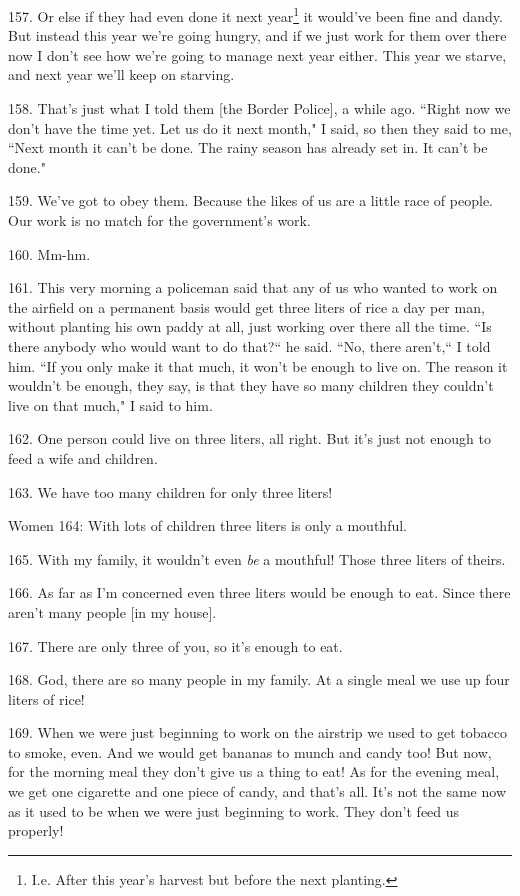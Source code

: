157. Or else if they had even done it next year\footnote{I.e. After this year's harvest but before the next planting.} it would've been fine and dandy.
But instead this year we're going hungry, and if we just work for them over there
now I don't see how we're going to manage next year either. This year we starve,
and next year we'll keep on starving.

158. That's just what I told them [the Border Police], a while ago. ``Right
now we don't have the time yet. Let us do it next month," I said, so then
they said to me, ``Next month it can't be done. The rainy season has already set
in. It can't be done."

159. We've got to obey them. Because the likes of us are a little race of people.
Our work is no match for the government's work.

160. Mm-hm.

161. This very morning a policeman said that any of us who wanted to work on the
airfield on a permanent basis would get three liters of rice a day per man, without
planting his own paddy at all, just working over there all the time. ``Is
there anybody who would want to do that?`` he said. ``No, there
aren't,`` I told him. ``If you only make it that much, it won't
be enough to live on. The reason it wouldn't be enough, they say, is that they
have so many children they couldn't live on that much," I said to him.

162. One person could live on three liters, all right. But it's just not enough
to feed a wife and children.

163. We have too many children for only three liters!

Women 164: With lots of children three liters is only a mouthful.

165. With my family, it wouldn't even \textit{be} a mouthful! Those three liters
of theirs.

166. As far as I'm concerned even three liters would be enough to eat. Since there
aren't many people [in my house].

167. There are only three of you, so it's enough to eat.

168. God, there are so many people in my family. At a single meal we use up four
liters of rice!

169. When we were just beginning to work on the airstrip we used to get tobacco
to smoke, even. And we would get bananas to munch and candy too! But now, for the
morning meal they don't give us a thing to eat! As for the evening meal, we get
one cigarette and one piece of candy, and that's all. It's not the same now as
it used to be when we were just beginning to work. They don't feed us properly!

